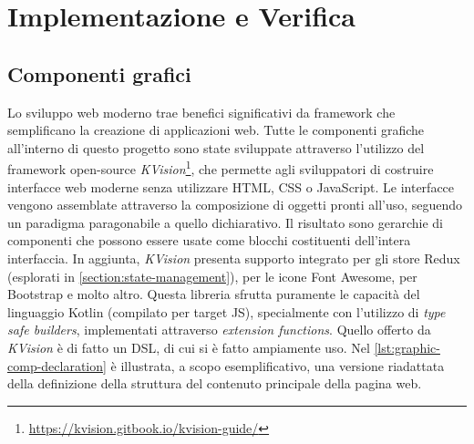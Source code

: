 \chapter{Implementazione e Verifica}

\section{Componenti grafici}
Lo sviluppo web moderno trae benefici significativi da framework che semplificano la creazione di applicazioni web. Tutte le componenti grafiche all'interno di questo progetto sono state sviluppate attraverso l'utilizzo del framework open-source \textit{KVision}\footnote{\url{https://kvision.gitbook.io/kvision-guide/}}, che permette agli sviluppatori di costruire interfacce web moderne senza utilizzare HTML, CSS o JavaScript. Le interfacce vengono assemblate attraverso la composizione di oggetti pronti all'uso, seguendo un paradigma paragonabile a quello dichiarativo. Il risultato sono gerarchie di componenti che possono essere usate come blocchi costituenti dell'intera interfaccia. In aggiunta, \textit{KVision} presenta supporto integrato per gli store Redux (esplorati in \cref{section:state-management}), per le icone Font Awesome, per Bootstrap e molto altro. Questa libreria sfrutta puramente le capacità del linguaggio Kotlin (compilato per target JS), specialmente con l'utilizzo di \textit{type safe builders}, implementati attraverso \textit{extension functions}. Quello offerto da \textit{KVision} è di fatto un \ac{DSL}, di cui si è fatto ampiamente uso.
Nel \cref{lst:graphic-comp-declaration} è illustrata, a scopo esemplificativo, una versione riadattata della definizione della struttura del contenuto principale della pagina web.



